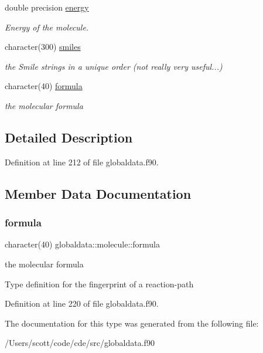 \begin{DoxyCompactItemize}
\mbox{\label{structglobaldata_1_1molecule_aee3e2013c26112ecd9848bf3ff76fd0a}} 
double precision \mbox{\hyperlink{structglobaldata_1_1molecule_aee3e2013c26112ecd9848bf3ff76fd0a}{energy}}
\begin{DoxyCompactList}\small\item\em Energy of the molecule. \end{DoxyCompactList}\item 
\mbox{\label{structglobaldata_1_1molecule_a5a9f0e701a938127fc32633ffbd6b0a2}} 
character(300) \mbox{\hyperlink{structglobaldata_1_1molecule_a5a9f0e701a938127fc32633ffbd6b0a2}{smiles}}
\begin{DoxyCompactList}\small\item\em the Smile strings in a unique order (not really very useful...) \end{DoxyCompactList}\item 
character(40) \mbox{\hyperlink{structglobaldata_1_1molecule_a5d0e1b38757d17b4eb6101c3863b8194}{formula}}
\begin{DoxyCompactList}\small\item\em the molecular formula \end{DoxyCompactList}\end{DoxyCompactItemize}


\subsection{Detailed Description}


Definition at line 212 of file globaldata.\+f90.



\subsection{Member Data Documentation}
\mbox{\label{structglobaldata_1_1molecule_a5d0e1b38757d17b4eb6101c3863b8194}} 
\subsubsection{\texorpdfstring{formula}{formula}}
{\footnotesize\ttfamily character(40) globaldata\+::molecule\+::formula}



the molecular formula 

Type definition for the fingerprint of a reaction-\/path 

Definition at line 220 of file globaldata.\+f90.



The documentation for this type was generated from the following file\+:\begin{DoxyCompactItemize}
\item 
/\+Users/scott/code/cde/src/globaldata.\+f90\end{DoxyCompactItemize}
